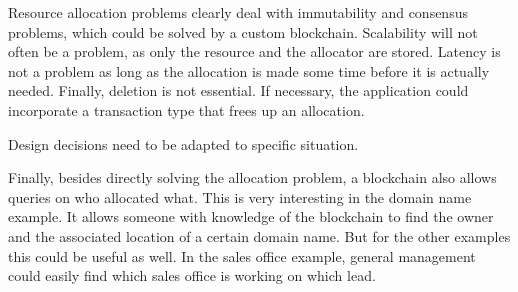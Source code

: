Resource allocation problems clearly deal with immutability and consensus problems, which could be solved by a custom blockchain. Scalability will not often be a problem, as only the resource and the allocator are stored. Latency is not a problem as long as the allocation is made some time before it is actually needed. Finally, deletion is not essential. If necessary, the application could incorporate a transaction type that frees up an allocation.

Design decisions need to be adapted to specific situation.

Finally, besides directly solving the allocation problem, a blockchain also allows queries on who allocated what. This is very interesting in the domain name example. It allows someone with knowledge of the blockchain to find the owner and the associated location of a certain domain name. But for the other examples this could be useful as well. In the sales office example, general management could easily find which sales office is working on which lead.